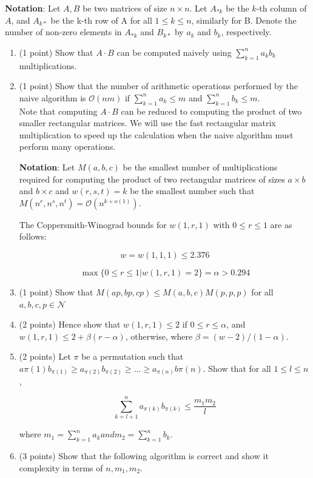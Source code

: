\documentclass[10pt,a4paper]{article}
\begin{document}
\textbf{Notation}: Let $A,B$ be two matrices of size $n\times n$. Let $A_{*k}$ be the $k$-th column of $A$, and $A_{k*}$ be the k-th row of A for all $1 \leq k \leq n$, similarly for B. Denote the number of non-zero elements in $A_{*k}$ and $B_{k*}$ by $a_k$ and $b_k$, respectively.
\begin{enumerate}
\item (1 point) Show that $A\cdot B$ can be computed naively using $\sum ^n_{k=1}a_kb_k$ multiplications.\\
\item (1 point) Show that the number of arithmetic operations performed by the naive algorithm is $\mathcal {O}(nm)$ if $\sum ^n_{k=1}a_k\leq m$ and $\sum ^n_{k=1}b_k \leq m$.
\\
Note that computing $A \cdot B$ can be reduced to computing the product of two smaller rectangular matrices. We will use the fast rectangular matrix multiplication to speed up the calculation when the naive algorithm must perform many operations.

\textbf{Notation}: Let $M(a,b,c)$ be the smallest number of multiplications required for computing the product of two rectangular matrices of sizes $a\times b$ and $b\times c$ and $w(r,s,t)=k$ be the smallest number such that $M(n^r,n^s,n^t)=\mathcal{O}(n^{k+o(1)})$. 

The Coppersmith-Winograd bounds for $w(1,r,1)$ with $0\leq r \leq1$ are as follows:

$$w=w(1,1,1)\leq 2.376$$

$$\max \{0 \leq r\leq 1|w(1,r,1)=2\}=\alpha >0.294$$

\item (1 point) Show that $M(ap,bp,cp) \leq M(a,b,c)M(p,p,p)$ for all $a,b,c,p\in \mathcal{N}$\\

\item (2 points) Hence show that $w(1,r,1)\leq 2$ if $0\leq r\leq \alpha$, and $w(1,r,1) \leq 2+ \beta (r - \alpha)$, otherwise, where $\beta=(w-2)/(1-\alpha)$.\\

\item (2 points) Let $\pi$ be a permutation such that $a\pi (1)b_{\pi (1)} \geq a_{\pi(2)} b_{\pi(2)} \geq … \geq a_{\pi(n)}b\pi(n)$. Show that for all $1\leq l\leq n$,

$$\sum ^n_{k=l+1}a_{\pi(k)}b_{\pi(k)} \leq \frac{m_1m_2}{l}$$

where $m_1=\sum ^n_{k=1}a_k and m_2=\sum ^n_{k=1}b_k.$\\

\item (3 points) Show that the following algorithm is correct and show it complexity in terms of $n,m_1,m_2$.
\end{enumerate}
\end{document}
